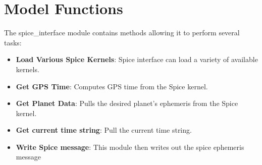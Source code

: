 \section{Model Functions}

The spice\_interface module contains methods allowing it to perform several tasks:

\begin{itemize}
	\item \textbf{Load Various Spice Kernels}: Spice interface can load a variety of available kernels.
	\item \textbf{Get GPS Time}: Computes GPS time from the Spice kernel.
	\item \textbf{Get Planet Data}: Pulls the desired planet's ephemeris from the Spice kernel.
	\item \textbf{Get current time string}: Pull the current time string.
	\item \textbf{Write Spice message}: This module then writes out the spice ephemeris message
\end{itemize}